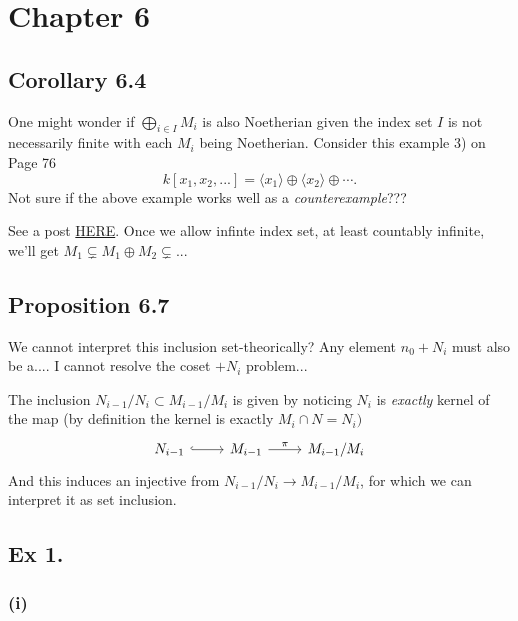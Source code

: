 \section{Chapter 6}

\subsection{Corollary 6.4}

One might wonder if $\bigoplus_{i\in I}M_i$ is also Noetherian given the index set $I$ is not necessarily finite with each $M_i$ being Noetherian. 
Consider this example 3) on Page 76
$$k[x_1,x_2,...]=\langle x_1\rangle \oplus\langle x_2\rangle\oplus\cdots.$$
Not sure if the above example works well as a \textit{counterexample}???

See a post \href{https://math.stackexchange.com/questions/173614/question-about-direct-sum-of-noetherian-modules-is-noetherian}{HERE}. 
Once we allow infinte index set, at least countably infinite, we'll get $M_1\subsetneq M_1\oplus M_2\subsetneq...$

\subsection{Proposition 6.7}

We cannot interpret this inclusion set-theorically? Any element $n_{0}+N_i$ must also be a.... I cannot resolve the coset $+N_i$ problem... 

The inclusion $N_{i-1}/N_i\subset M_{i-1}/M_i$ is given by noticing $N_i$ is \textit{exactly} kernel of the map (by definition the kernel is exactly $M_i\cap N=N_{i})$
\[\begin{tikzcd}
	{N_{i-1}} & {M_{i-1}} & {M_{i-1}/M_i}
	\arrow[hook, from=1-1, to=1-2]
	\arrow["\pi", from=1-2, to=1-3]
\end{tikzcd}\]
And this induces an injective from $N_{i-1}/N_i\to M_{i-1}/M_i$, for which we can interpret it as set inclusion.

\subsection{Ex 1.}

\subsubsection{(i)}

